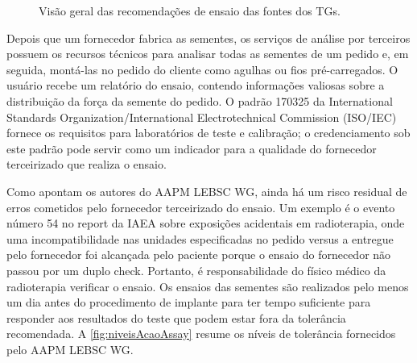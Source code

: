 \documentclass[11pt,a4paper]{article}
\newcounter{exemplo}
\begin{document}
	\begin{figure}[h]
		\centering
		\caption{Visão geral das recomendações de ensaio das fontes dos TGs.}
		\label{fig:recomendacoesAssay}
	\end{figure}

	Depois que um fornecedor fabrica as sementes, os serviços de análise por terceiros possuem os recursos técnicos para analisar todas as sementes de um pedido e, em seguida, montá-las no pedido do cliente como agulhas ou fios pré-carregados. O usuário recebe um relatório do ensaio, contendo informações valiosas sobre a distribuição da força da semente do pedido. O padrão 170325 da International Standards Organization/International Electrotechnical Commission (ISO/IEC) fornece os requisitos para laboratórios de teste e calibração; o credenciamento sob este padrão pode servir como um indicador para a qualidade do fornecedor terceirizado que realiza o ensaio. 

	Como apontam os autores do AAPM LEBSC WG, ainda há um risco residual de erros cometidos pelo fornecedor terceirizado do ensaio. Um exemplo é o evento número 54 no report da IAEA sobre exposições acidentais em radioterapia, onde uma incompatibilidade nas unidades especificadas no pedido versus a entregue pelo fornecedor foi alcançada pelo paciente porque o ensaio do fornecedor não passou por um duplo check. Portanto, é responsabilidade do físico médico da radioterapia verificar o ensaio. Os ensaios das sementes são realizados pelo menos um dia antes do procedimento de implante para ter tempo suficiente para responder aos resultados do teste que podem estar fora da tolerância recomendada. A \ref{fig:niveisAcaoAssay} resume os níveis de tolerância fornecidos pelo AAPM LEBSC WG.
\end{document}

